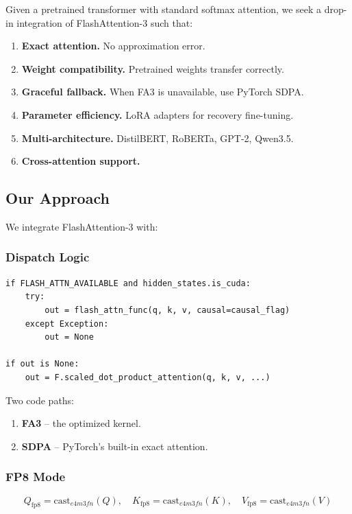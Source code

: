 Given a pretrained transformer with standard softmax attention, we seek a 
drop-in integration of FlashAttention-3 such that:

\begin{enumerate}
\item \textbf{Exact attention.} No approximation error.
\item \textbf{Weight compatibility.} Pretrained weights transfer correctly.
\item \textbf{Graceful fallback.} When FA3 is unavailable, use PyTorch SDPA.
\item \textbf{Parameter efficiency.} LoRA adapters for recovery fine-tuning.
\item \textbf{Multi-architecture.} DistilBERT, RoBERTa, GPT-2, Qwen3.5.
\item \textbf{Cross-attention support.}

\end{enumerate}
\subsection{Our Approach}

We integrate FlashAttention-3 with:

\subsubsection{Dispatch Logic}

\begin{lstlisting}
if FLASH_ATTN_AVAILABLE and hidden_states.is_cuda:
    try:
        out = flash_attn_func(q, k, v, causal=causal_flag)
    except Exception:
        out = None

if out is None:
    out = F.scaled_dot_product_attention(q, k, v, ...)
\end{lstlisting}

Two code paths:
\begin{enumerate}
\item \textbf{FA3} -- the optimized kernel.
\item \textbf{SDPA} -- PyTorch's built-in exact attention.

\end{enumerate}
\subsubsection{FP8 Mode}

\[
Q_\text{fp8} = \text{cast}_{e4m3fn}(Q), \quad
K_\text{fp8} = \text{cast}_{e4m3fn}(K), \quad
V_\text{fp8} = \text{cast}_{e4m3fn}(V)
\tag{1.2}
\]

